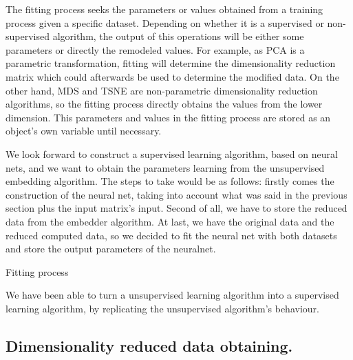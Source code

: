 \documentclass[a4paper,11pt,spanish]{report}
\makeatletter
\def\BState{\State\hskip-\ALG@thistlm}
\makeatother
\begin{document}
The fitting process seeks the parameters or values obtained from a training process given a specific dataset. Depending on whether it is a supervised or non-supervised algorithm, the output of this operations will be either some parameters or directly the remodeled values. For example, as PCA is a parametric transformation, fitting will determine the dimensionality reduction matrix which could afterwards be used to determine the modified data. On the other hand, MDS and TSNE are non-parametric dimensionality reduction algorithms, so the fitting process directly obtains the values from the lower dimension. This parameters and values in the fitting process are stored as an object's own variable until necessary.

We look forward to construct a supervised learning algorithm, based on neural nets, and we want to obtain the parameters learning from the unsupervised embedding algorithm. The steps to take would be as follows: firstly comes the construction of the neural net, taking into account what was said in the previous section plus the input matrix's input. Second of all, we have to store the reduced data from the embedder algorithm. At last, we have the original data and the reduced computed data, so we decided to fit the neural net with both datasets and store the output parameters of the neuralnet.
\vspace{10pt}

\begin{algorithm}
\caption{Fitting process}
\end{algorithm}

We have been able to turn a unsupervised learning algorithm into a supervised learning algorithm, by replicating the unsupervised algorithm's behaviour.

\subsection{Dimensionality reduced data obtaining.}
\label{ssec:trans}
\end{document}

